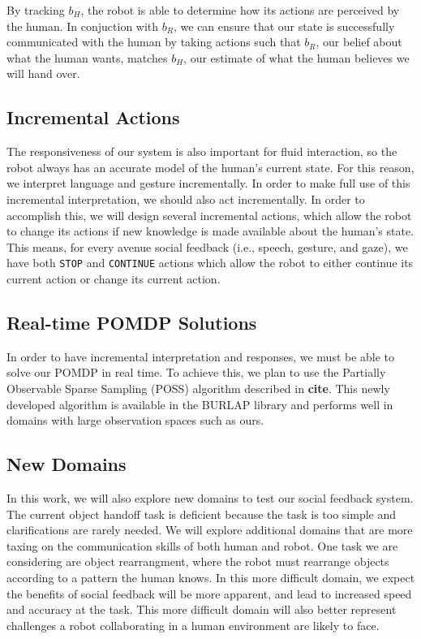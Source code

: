 \documentclass{article}
\begin{document}
By tracking $b_H$, the robot is able to determine how its actions are perceived by the human. In conjuction with $b_R$, we can ensure that our state is successfully communicated with the human by taking actions such that $b_R$, our belief about what the human wants, matches $b_H$, our estimate of what the human believes we will hand over. 


\subsection{Incremental Actions}

The responsiveness of our system is also important for fluid interaction, so the robot always has an accurate model of the human's current state. For this reason, we interpret language and gesture incrementally. In order to make full use of this incremental interpretation, we should also act incrementally. In order to accomplish this, we will design several incremental actions, which allow the robot to change its actions if new knowledge is made available about the human's state. This means, for every avenue social feedback (i.e., speech, gesture, and gaze), we have both \texttt{STOP} and \texttt{CONTINUE} actions which allow the robot to either continue its current action or change its current action. 

\subsection{Real-time POMDP Solutions}

In order to have incremental interpretation and responses, we must be able to solve our POMDP in real time. To achieve this, we plan to use the Partially Observable Sparse Sampling (POSS) algorithm described in \textbf{cite}. This newly developed algorithm is available in the BURLAP library and performs well in domains with large observation spaces such as ours. 

\subsection{New Domains}

In this work, we will also explore new domains to test our social feedback system. The current object handoff task is deficient because the task is too simple and clarifications are rarely needed. We will explore additional domains that are more taxing on the communication skills of both human and robot. One task we are considering are object rearrangment, where the robot must rearrange objects according to a pattern the human knows. In this more difficult domain, we expect the benefits of social feedback will be more apparent, and lead to increased speed and accuracy at the task. This more difficult domain will also better represent challenges a robot collaborating in a human environment are likely to face. 
\end{document}
